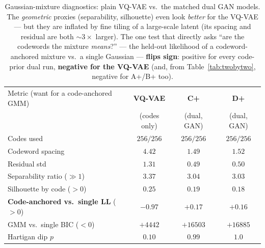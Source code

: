 \documentclass[11pt]{article}
\newcommand{\good}[1]{\textcolor{green!55!black}{#1}}
\newcommand{\bad}[1]{\textcolor{red!70!black}{#1}}
\begin{document}
\begin{table}[h]
\centering
\caption{Gaussian-mixture diagnostics: plain VQ-VAE vs.\ the matched dual GAN models. The
\emph{geometric} proxies (separability, silhouette) even look \emph{better} for the VQ-VAE --- but
they are inflated by fine tiling of a large-scale latent (its spacing and residual are both
$\sim$$3\times$ larger). The one test that directly asks ``are the codewords the mixture
\emph{means}?'' --- the held-out likelihood of a codeword-anchored mixture vs.\ a single Gaussian
--- \textbf{flips sign}: positive for every code-prior dual run, \textbf{negative for the VQ-VAE}
(and, from Table~\ref{tab:twobytwo}, negative for A+/B+ too).}
\label{tab:vqcontrol}
\small
\begin{tabular}{lccc}
\toprule
Metric (want for a code-anchored GMM) & \textbf{VQ-VAE} & \textbf{C+} & \textbf{D+}\\
 & (codes only) & (dual, GAN) & (dual, GAN)\\
\midrule
Codes used                            & $256/256$ & $256/256$ & $256/256$\\
Codeword spacing                      & $4.42$ & $1.49$ & $1.52$\\
Residual std                          & $1.31$ & $0.49$ & $0.50$\\
Separability ratio ($\gg1$)           & $3.37$ & $3.04$ & $3.03$\\
Silhouette by code ($>0$)             & $0.25$ & $0.19$ & $0.18$\\
\textbf{Code-anchored vs.\ single LL} ($>0$) & \bad{$-0.97$} & \good{$+0.17$} & \good{$+0.16$}\\
GMM vs.\ single BIC ($<0$)            & \bad{$+4442$} & \bad{$+16503$} & \bad{$+16885$}\\
Hartigan dip $p$                      & $0.10$ & $0.99$ & $1.0$\\
\bottomrule
\end{tabular}
\end{table}
\end{document}
